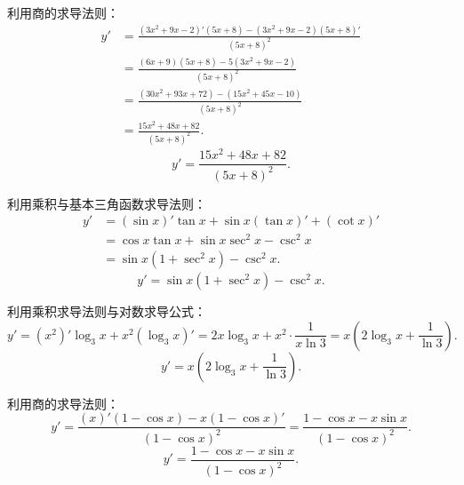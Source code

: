 \begin{solution}

    利用商的求导法则：
    \begin{equation}
        \begin{aligned}
            y' & = \frac{(3x^2+9x-2)'(5x+8) - (3x^2+9x-2)(5x+8)'}{(5x+8)^2} \\
               & = \frac{(6x+9)(5x+8) - 5(3x^2+9x-2)}{(5x+8)^2}             \\
               & = \frac{(30x^2 + 93x + 72) - (15x^2 + 45x - 10)}{(5x+8)^2} \\
               & = \frac{15x^2 + 48x + 82}{(5x+8)^2}.
        \end{aligned}
    \end{equation}
    \begin{equation}
        \boxed{y' = \frac{15x^2 + 48x + 82}{(5x+8)^2}.}
    \end{equation}


    利用乘积与基本三角函数求导法则：
    \begin{equation}
        \begin{aligned}
            y' & = (\sin x)' \tan x + \sin x (\tan x)' + (\cot x)' \\
               & = \cos x \tan x + \sin x \sec^2 x - \csc^2 x      \\
               & = \sin x (1 + \sec^2 x) - \csc^2 x.
        \end{aligned}
    \end{equation}
    \begin{equation}
        \boxed{y' = \sin x (1 + \sec^2 x) - \csc^2 x.}
    \end{equation}


    利用乘积求导法则与对数求导公式：
    \begin{equation}
        y' = (x^2)' \log_3 x + x^2 (\log_3 x)' = 2x \log_3 x + x^2 \cdot \frac{1}{x \ln 3} = x\left( 2\log_3 x + \frac{1}{\ln 3} \right).
    \end{equation}
    \begin{equation}
        \boxed{y' = x\left( 2\log_3 x + \frac{1}{\ln 3} \right).}
    \end{equation}


    利用商的求导法则：
    \begin{equation}
        y' = \frac{(x)'(1-\cos x) - x(1-\cos x)'}{(1-\cos x)^2} = \frac{1 - \cos x - x\sin x}{(1-\cos x)^2}.
    \end{equation}
    \begin{equation}
        \boxed{y' = \frac{1 - \cos x - x\sin x}{(1-\cos x)^2}.}
    \end{equation}


\end{solution}
